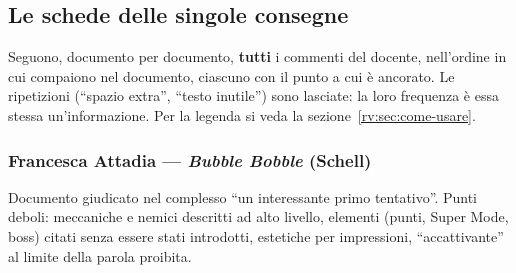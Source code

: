 \subsection{Le schede delle singole consegne}
\label{rv:t1:sec:schede}

Seguono, documento per documento, \textbf{tutti} i commenti del docente,
nell'ordine in cui compaiono nel documento, ciascuno con il punto a cui è
ancorato. Le ripetizioni (``spazio extra'', ``testo inutile'') sono lasciate:
la loro frequenza è essa stessa un'informazione. Per la legenda si veda la
sezione~\ref{rv:sec:come-usare}.

\subsubsection{Francesca Attadia --- \emph{Bubble Bobble} (Schell)}
Documento giudicato nel complesso ``un interessante primo tentativo''. Punti
deboli: meccaniche e nemici descritti ad alto livello, elementi (punti, Super
Mode, boss) citati senza essere stati introdotti, estetiche per impressioni,
``accattivante'' al limite della parola proibita.
